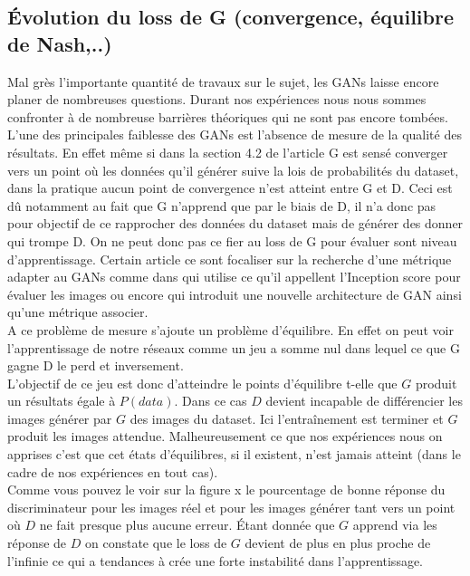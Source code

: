 \documentclass[11pt,francais]{article}
\begin{document}
\subsection{Évolution du loss de G (convergence, équilibre de Nash,..)}
\label{sec:LossG_et_Convergeance}
Mal grès l'importante quantité de travaux sur le sujet, les GANs laisse encore planer de nombreuses questions.
Durant nos expériences nous nous sommes confronter à de nombreuse barrières théoriques qui ne sont pas encore tombées. 
L'une des principales faiblesse des GANs est l'absence de mesure de la qualité des résultats. En effet même si dans la section 4.2 de l'article \cite{NIPS2014_5423} G est sensé converger vers un point où les données qu'il générer suive la lois de probabilités du dataset, dans la pratique aucun point de convergence n'est atteint entre G et D. Ceci est dû notamment au fait que G n'apprend que par le biais de D, il n'a donc pas pour objectif de ce rapprocher des données du dataset mais de générer des donner qui trompe D. On ne peut donc pas ce fier au loss de G pour évaluer sont niveau d'apprentissage.
Certain article ce sont focaliser sur la recherche d'une métrique adapter au GANs comme dans \cite{salimans2016improved} qui utilise ce qu'il appellent l'Inception score pour évaluer les images ou encore \cite{berthelot2017began} qui introduit une nouvelle architecture de GAN ainsi qu'une métrique associer.\\
A ce problème de mesure s'ajoute un problème d'équilibre.
En effet on peut voir l'apprentissage de notre réseaux comme un jeu a somme nul dans lequel ce que G gagne D le perd et inversement.\\
L'objectif de ce jeu est donc d'atteindre le points d'équilibre t-elle que \(G\) produit un résultats égale à \(P(data)\). Dans ce cas \(D\) devient incapable de différencier les images générer par \(G\) des images du dataset. Ici l'entraînement est terminer et \(G\) produit les images attendue.
Malheureusement ce que nos expériences nous on apprises c'est que cet états d'équilibres, si il existent, n'est jamais atteint (dans le cadre de nos expériences en tout cas).\\
Comme vous pouvez le voir sur la figure x le pourcentage de bonne réponse du discriminateur pour les images réel et pour les images générer tant vers un point où \(D\) ne fait presque plus aucune erreur. Étant donnée que \(G\) apprend via les réponse de \(D\) on constate que le loss de \(G\) devient de plus en plus proche de l'infinie ce qui a tendances à crée une forte instabilité dans l'apprentissage. 
\end{document}
